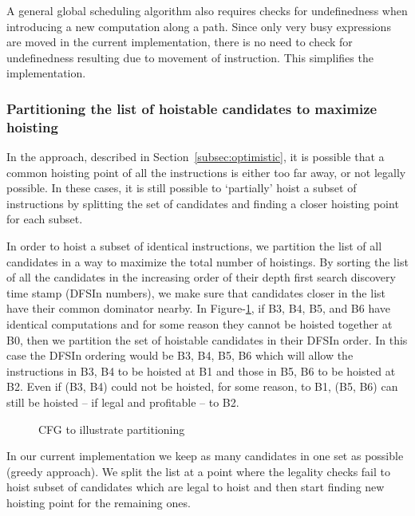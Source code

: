 \documentclass[acmlarge,review]{acmart}\settopmatter{printfolios=true}
\begin{document}
A general global scheduling algorithm also requires checks for undefinedness
when introducing a new computation along a path. Since only very busy
expressions are moved in the current implementation, there is no need to check
for undefinedness resulting due to movement of instruction. This simplifies the
implementation.

\subsubsection{Partitioning the list of hoistable candidates to maximize hoisting}
\label{subsec:partition}
In the approach, described in Section~\ref{subsec:optimistic}, it is possible
that a common hoisting point of all the instructions is either too far away, or
not legally possible. In these cases, it is still possible to `partially' hoist
a subset of instructions by splitting the set of candidates and finding a closer
hoisting point for each subset.

In order to hoist a subset of identical instructions, we partition the list of
all candidates in a way to maximize the total number of hoistings.  By sorting
the list of all the candidates in the increasing order of their depth first
search discovery time stamp \cite{clrs} (DFSIn numbers), we make sure that
candidates closer in the list have their common dominator nearby. In
Figure-\ref{fig:dfsin}, if B3, B4, B5, and B6 have identical computations and
for some reason they cannot be hoisted together at B0, then we partition the set
of hoistable candidates in their DFSIn order. In this case the DFSIn ordering
would be B3, B4, B5, B6 which will allow the instructions in B3, B4 to be
hoisted at B1 and those in B5, B6 to be hoisted at B2. Even if (B3, B4) could
not be hoisted, for some reason, to B1, (B5, B6) can still be hoisted -- if
legal and profitable -- to B2.

\begin{figure}
\centering
\caption{CFG to illustrate partitioning}
\label{fig:dfsin}
\end{figure}

In our current implementation we keep as many candidates in one set as possible
(greedy approach). We split the list at a point where the legality checks fail
to hoist subset of candidates which are legal to hoist and then start finding
new hoisting point for the remaining ones.
\end{document}
